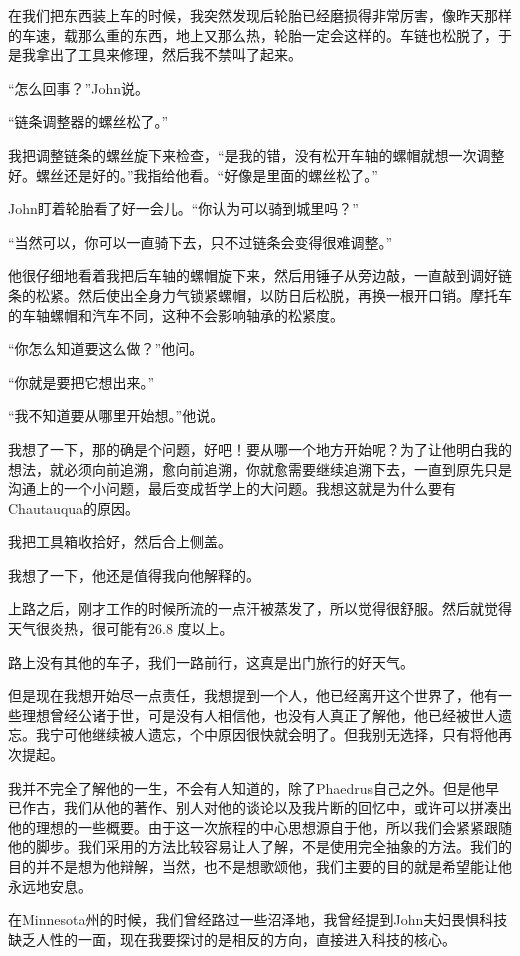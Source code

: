 \documentclass[UTF8]{article}
\begin{document}
\par 在我们把东西装上车的时候，我突然发现后轮胎已经磨损得非常厉害，像昨天那样的车速，载那么重的东西，地上又那么热，轮胎一定会这样的。车链也松脱了，于是我拿出了工具来修理，然后我不禁叫了起来。
\par “怎么回事？”John说。
\par “链条调整器的螺丝松了。”
\par 我把调整链条的螺丝旋下来检查，“是我的错，没有松开车轴的螺帽就想一次调整好。螺丝还是好的。”我指给他看。“好像是里面的螺丝松了。”
\par John盯着轮胎看了好一会儿。“你认为可以骑到城里吗？”
\par “当然可以，你可以一直骑下去，只不过链条会变得很难调整。”
\par 他很仔细地看着我把后车轴的螺帽旋下来，然后用锤子从旁边敲，一直敲到调好链条的松紧。然后使出全身力气锁紧螺帽，以防日后松脱，再换一根开口销。摩托车的车轴螺帽和汽车不同，这种不会影响轴承的松紧度。
\par “你怎么知道要这么做？”他问。
\par “你就是要把它想出来。”
\par “我不知道要从哪里开始想。”他说。
\par 我想了一下，那的确是个问题，好吧！要从哪一个地方开始呢？为了让他明白我的想法，就必须向前追溯，愈向前追溯，你就愈需要继续追溯下去，一直到原先只是沟通上的一个小问题，最后变成哲学上的大问题。我想这就是为什么要有Chautauqua的原因。
\par 我把工具箱收拾好，然后合上侧盖。
\par 我想了一下，他还是值得我向他解释的。
\par 上路之后，刚才工作的时候所流的一点汗被蒸发了，所以觉得很舒服。然后就觉得天气很炎热，很可能有26.8 度以上。
\par 路上没有其他的车子，我们一路前行，这真是出门旅行的好天气。
\par 但是现在我想开始尽一点责任，我想提到一个人，他已经离开这个世界了，他有一些理想曾经公诸于世，可是没有人相信他，也没有人真正了解他，他已经被世人遗忘。我宁可他继续被人遗忘，个中原因很快就会明了。但我别无选择，只有将他再次提起。
\par 我并不完全了解他的一生，不会有人知道的，除了Phaedrus自己之外。但是他早已作古，我们从他的著作、别人对他的谈论以及我片断的回忆中，或许可以拼凑出他的理想的一些概要。由于这一次旅程的中心思想源自于他，所以我们会紧紧跟随他的脚步。我们采用的方法比较容易让人了解，不是使用完全抽象的方法。我们的目的并不是想为他辩解，当然，也不是想歌颂他，我们主要的目的就是希望能让他永远地安息。
\par 在Minnesota州的时候，我们曾经路过一些沼泽地，我曾经提到John夫妇畏惧科技缺乏人性的一面，现在我要探讨的是相反的方向，直接进入科技的核心。
\end{document}
